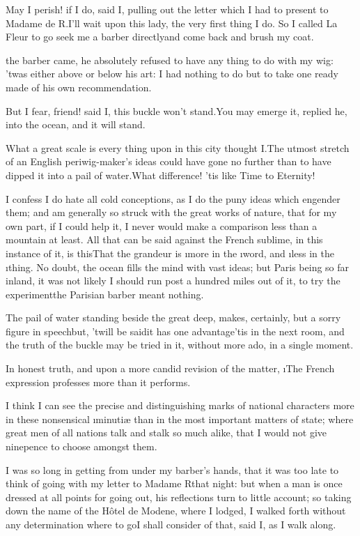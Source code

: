 \documentclass[twoside]{article}
\begin{document}
\tsk May I perish! if I do, said I, pulling out the letter which I had to
present to Madame de R\tsk .\tsk I’ll wait upon this lady, the very first thing I
do.  So I called La Fleur to go seek me a barber directly\tsk and come back
and brush my coat.






 the barber came, he absolutely refused to have any thing to do with
my wig: ’twas either above or below his art: I had nothing to do but to
take one ready made of his own recommendation.

\tsk But I fear, friend! said I, this buckle won’t stand.\tsk You may emerge it,
replied he, into the ocean, and it will stand.\tsk 

What a great scale is every thing upon in this city thought I.\tsk The utmost
stretch of an English periwig-maker’s ideas could have gone no further
than to have \lqq dipped it into a pail of water.\rqq\tsk What difference! ’tis like
Time to Eternity!

I confess I do hate all cold conceptions, as I do the puny ideas which
engender them; and am generally so struck with the great works of nature,
that for my own part, if I could help it, I never would make a comparison
less than a mountain at least.  All that can be said against the French
sublime, in this instance of it, is this\tsk That the grandeur is \i{more} in
the \i{word}, and \i{less} in the \i{thing}.  No doubt, the ocean fills the
mind with vast ideas; but Paris being so far inland, it was not likely I
should run post a hundred miles out of it, to try the experiment\tsk the
Parisian barber meant nothing.\tsk 

The pail of water standing beside the great deep, makes, certainly, but a
sorry figure in speech\tsk but, ’twill be said\tsk it has one advantage\tsk ’tis in
the next room, and the truth of the buckle may be tried in it, without
more ado, in a single moment.

In honest truth, and upon a more candid revision of the matter, \i{The
French expression professes more than it performs}.

I think I can see the precise and distinguishing marks of national
characters more in these nonsensical \i{minutiæ} than in the most important
matters of state; where great men of all nations talk and stalk so much
alike, that I would not give ninepence to choose amongst them.

I was so long in getting from under my barber’s hands, that it was too
late to think of going with my letter to Madame R\tsk  that night: but when a
man is once dressed at all points for going out, his reflections turn to
little account; so taking down the name of the Hôtel de Modene, where I
lodged, I walked forth without any determination where to go\tsk I shall
consider of that, said I, as I walk along.
\end{document}
